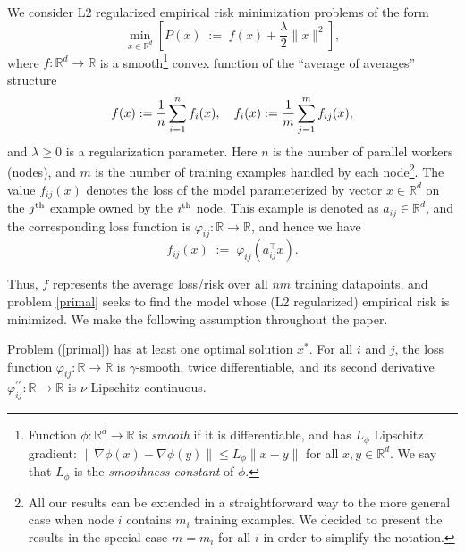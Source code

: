 \documentclass[10pt]{article}
\newcommand{\squeeze}{}
\newcommand{\eqdef}{\; { := }\;}
\newcommand{\R}{\mathbb{R}}
\begin{document}
We consider L2 regularized empirical risk minimization problems of the form
\begin{equation}\label{primal}
\squeeze 
\min \limits_{x\in \mathbb{R}^d} \left[ P(x) \eqdef f(x) + \frac{\lambda}{2}\|x\|^2  \right],
\end{equation}
where $f:\R^d \to \R$ is a smooth\footnote{Function $\phi:\R^d\to \R$ is {\em smooth} if it is differentiable, and has $L_\phi$ Lipschitz gradient: $\|\nabla \phi(x)- \nabla \phi(y)\| \leq L_\phi  \|x-y\|$ for all $x,y\in \R^d$. We say that $L_\phi$ is the {\em smoothness constant} of $\phi$.} convex function of the ``average of averages'' structure
\begin{equation} \label{eq:f_and_f_i} 
 \squeeze f(x) \eqdef\frac{1}{n}\sum \limits_{i=1}^n  f_i(x), \quad f_i(x) \eqdef \frac{1}{m} \sum \limits \limits_{j=1}^{m} f_{ij}(x), \end{equation}
and $\lambda\geq 0$ is a regularization parameter. Here $n$ is the number of parallel workers (nodes), and $m$ is the number of training examples handled by each node\footnote{All our results can be extended in a straightforward way to the more general case when node $i$ contains $m_i$ training examples. We decided to present the results in the special case $m=m_i$ for all $i$ in order to simplify the notation. }.  
The value $f_{ij}(x)$ denotes the loss of the model parameterized by vector $x\in \R^d$ on the $j^{\rm th}$ example owned by the $i^{\rm th}$ node. This example is denoted as $a_{ij} \in \R^d$, and the corresponding loss function is $\varphi_{ij}:\R \to \R$, and hence we have
\begin{equation}\label{eq:f_ij} f_{ij}(x) \eqdef \varphi_{ij}(a_{ij}^\top x).\end{equation}

Thus, $f$ represents the average loss/risk over all $nm$ training datapoints, and problem \eqref{primal} seeks to find the model whose (L2 regularized) empirical risk is minimized. We make the following assumption throughout the paper. 
\begin{assumption}\label{as:general}
Problem (\ref{primal}) has at least one optimal solution $x^*$. For all  $i$ and $j$, the loss function $\varphi_{ij}: \mathbb{R} \to \mathbb{R}$ is $\gamma$-smooth, twice differentiable, and its second derivative $\varphi_{ij}^{\prime\prime} : \R \to \R$ is $\nu$-Lipschitz continuous.
\end{assumption} 
\end{document}
